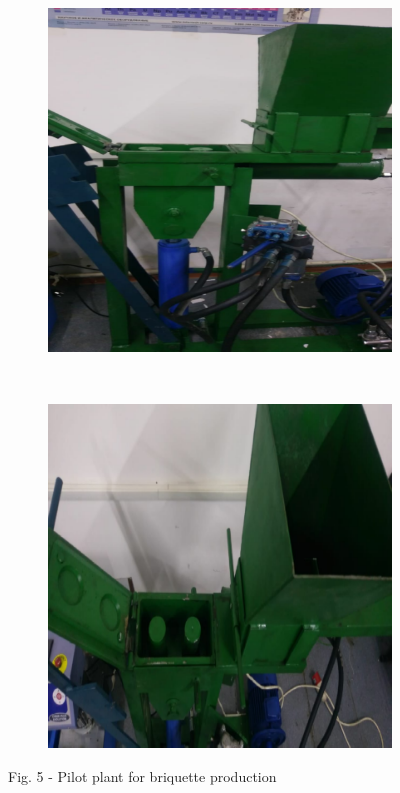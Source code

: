 \begin{figure}[H]
  \centering
  \begin{subfigure}{0.45\textwidth}
    \includegraphics[width=\textwidth]{media/gorn2/image7}
  \end{subfigure}%
  ~%
  \begin{subfigure}{0.45\textwidth}
    \includegraphics[width=\textwidth]{media/gorn2/image8}
  \end{subfigure}
  \caption*{Fig. 5 - Pilot plant for briquette production}
\end{figure}

